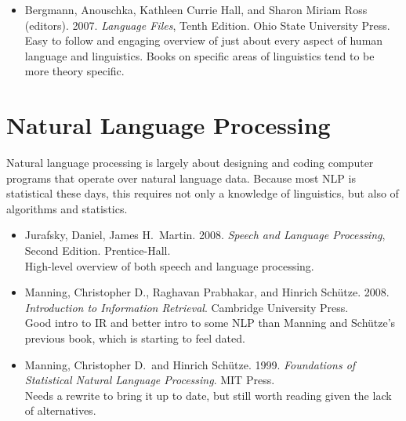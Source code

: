 \begin{itemize}
%
\item Bergmann, Anouschka, Kathleen Currie Hall, and Sharon Miriam Ross (editors).
2007.
{\it Language Files}, Tenth Edition.
Ohio State University Press.
\\
{\footnotesize Easy to follow and engaging overview of just about every
aspect of human language and linguistics.  Books on specific areas of
linguistics tend to be more theory specific.}
%
\end{itemize}


\section{Natural Language Processing}

\noindent
Natural language processing is largely about designing and coding computer
programs that operate over natural language data.  Because most NLP is
statistical these days, this requires not only a knowledge of linguistics,
but also of algorithms and statistics.

\begin{itemize}
\item
Jurafsky, Daniel, James H.\ Martin.
2008.
{\it Speech and Language Processing}, Second Edition.
Prentice-Hall.
\\
{\footnotesize High-level overview of both speech and language
processing.}
%
\item
Manning, Christopher D., Raghavan Prabhakar, and Hinrich Sch\"utze.
2008.
{\it Introduction to Information Retrieval}.
Cambridge University Press.
\\
{\footnotesize Good intro to IR and better intro to some NLP than
Manning and Sch\"utze's previous book, which is starting to feel
dated.}
%
\item
Manning, Christopher D.\ and Hinrich Sch\"utze.
1999.
{\it Foundations of Statistical Natural Language Processing}.
MIT Press.
\\
{\footnotesize Needs a rewrite to bring it up to date, but still
worth reading given the lack of alternatives.}
\end{itemize}






